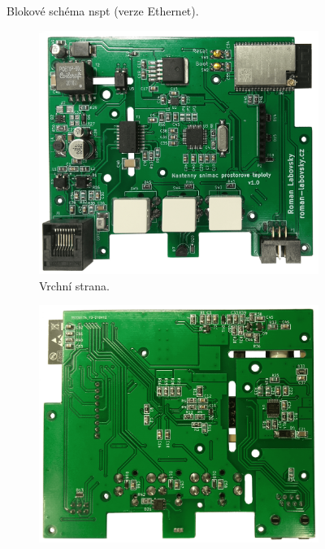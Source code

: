 \begin{figure}[H]
    \centering
    \def\svgwidth{\columnwidth}
    
    \caption[]{Blokové schéma \acrshort{nspt} (verze Ethernet).}
    \label{fig:blokove-schema-nastenny-snimac-teploty-ethernet}
\end{figure}


\begin{figure}[H]
\centering
\begin{subfigure}{.5\textwidth}
  \centering
  \includegraphics[width=\textwidth]{images/nastenny-snimac-prostorove-teploty-ethernet/dps-nastenny-snimac-prostorove-teploty-ethernet-vrchni-cast.png}
  \caption{Vrchní strana.}
  \label{fig:dps-nastenny-snimac-prostorove-teploty-ethernet-vrchni-cast}
\end{subfigure}%
\begin{subfigure}{.5\textwidth}
  \centering
  \includegraphics[width=\textwidth]{images/nastenny-snimac-prostorove-teploty-ethernet/dps-nastenny-snimac-prostorove-teploty-ethernet-spodni-cast.png}

\end{subfigure}
\end{figure}
